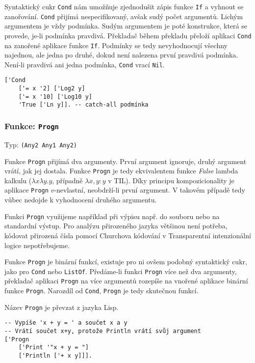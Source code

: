 Syntaktický cukr \lstinline{Cond} nám umožňuje zjednodušit zápis funkce \lstinline{If} a vyhnout
se zanořování. \lstinline{Cond} přijímá nespecifikovaný, avšak sudý počet argumentů. Lichým
argumentem je vždy podmínka. Sudým argumentem je poté konstrukce, která se provede, je-li podmínka
pravdivá. Překladač během překladu přeloží aplikaci \lstinline{Cond} na zanořené aplikace funkce
\lstinline{If}. Podmínky se tedy nevyhodnocují všechny najednou, ale jedna po druhé, dokud není
nalezena první pravdivá podmínka. Není-li pravdivá ani jedna podmínka, \lstinline{Cond} vrací
\lstinline{Nil}.

\begin{lstlisting}[caption={Ukázka využití Cond}]
['Cond
    ['= x '2] ['Log2 y]
    ['= x '10] ['Log10 y]
    'True ['Ln y]]. -- catch-all podmínka
\end{lstlisting}

\subsubsection*{Funkce: \lstinline{Progn}}\label{progn-fn}
Typ: \lstinline{(Any2 Any1 Any2)}

Funkce \lstinline{Progn} přijímá dva argumenty. První argument ignoruje, druhý argument vrátí, jak
jej dostala. Funkce \lstinline{Progn} je tedy ekvivalentem funkce \textit{False} lambda kalkulu
($\lambda x \lambda y . y$, případně $\lambda x, y: y$ v TIL). Díky principu kompozicionality je aplikace
\lstinline{Progn} $v$-nevlastní, neobdrží-li první argument. V takovém případě tedy vůbec nedojde
k vyhodnocení druhého argumentu.

Funkci \lstinline{Progn} využijeme například při výpisu např. do souboru nebo na standardní výstup.
Pro analýzu přirozeného jazyka většinou není potřeba, kódovat přirozená čísla pomocí Churchova
kódování v Transparentní intenzionální logice nepotřebujeme.

Funkce \lstinline{Progn} je binární funkcí, existuje pro ni ovšem podobný syntaktický cukr, jako pro
\lstinline{Cond} nebo \lstinline{ListOf}. Předáme-li funkci \lstinline{Progn} více než dva
argumenty, překladač aplikaci \lstinline{Progn} na více argumentů rozepíše na vnořené aplikace
binární funkce \lstinline{Progn}. Narozdíl od \lstinline{Cond}, \lstinline{Progn} je tedy
skutečnou funkcí.

Název \lstinline{Progn} je převzat z jazyka Lisp.

\begin{lstlisting}[caption={Ukázka využití Progn}]
-- Vypíše 'x + y = ' a součet x a y
-- Vrátí součet x+y, protože Println vrátí svůj argument
['Progn
    ['Print '"x + y = "]
    ['Println ['+ x y]]].
\end{lstlisting}

